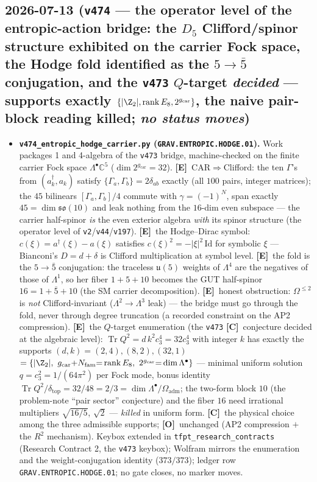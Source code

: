 \documentclass[11pt]{article}
\providecommand{\mE}{\textbf{[E]}}\providecommand{\mC}{\textbf{[C]}}
\providecommand{\mO}{\textbf{[O]}}\providecommand{\mX}{\textbf{[X]}}
\providecommand{\cthree}{c_3}\providecommand{\phiz}{\varphi_0^{\mathrm{ret}}}
\providecommand{\gcar}{g_{\mathrm{car}}}\providecommand{\Nfam}{N_{\mathrm{fam}}}
\providecommand{\Oadm}{\Omega_{\mathrm{adm}}}\providecommand{\ainv}{\alpha^{-1}}
\begin{document}
\subsection*{2026-07-13 (\texttt{v474} --- the operator level of the entropic-action bridge: the $D_5$ Clifford/spinor structure exhibited on the carrier Fock space, the Hodge fold identified as the $5{\to}\bar5$ conjugation, and the \texttt{v473} $Q$-target \emph{decided} --- supports exactly $\{|\Z_2|,\operatorname{rank}E_8,2^{\gcar}\}$, the naive pair-block reading killed; \emph{no status moves})}
\begin{itemize}[leftmargin=1.5em]
\item \textbf{\texttt{v474\_entropic\_hodge\_carrier.py} (\texttt{GRAV.ENTROPIC.HODGE.01}).} Work packages
1 and 4-algebra of the \texttt{v473} bridge, machine-checked on the finite carrier Fock space
$\Lambda^\bullet\mathbb C^5$ ($\dim 2^{\gcar}{=}32$). \mE\ CAR${\Rightarrow}$Clifford: the ten
$\Gamma$'s from $(a_k^\dagger,a_k)$ satisfy $\{\Gamma_a,\Gamma_b\}{=}2\delta_{ab}$ exactly (all $100$
pairs, integer matrices); the $45$ bilinears $[\Gamma_a,\Gamma_b]/4$ commute with $\gamma{=}(-1)^N$,
span exactly $45{=}\dim\mathfrak{so}(10)$ and leak nothing from the $16$-dim even subspace --- the
carrier half-spinor \emph{is} the even exterior algebra \emph{with} its spinor structure (the operator
level of \texttt{v2}/\texttt{v44}/\texttt{v197}). \mE\ the Hodge--Dirac symbol: $c(\xi){=}a^\dagger(\xi)
{-}a(\xi)$ satisfies $c(\xi)^2{=}-|\xi|^2\,\mathrm{Id}$ for symbolic $\xi$ --- Bianconi's $D{=}d{+}
\delta$ is Clifford multiplication at symbol level. \mE\ the fold is the $5{\to}\bar5$ conjugation:
the traceless $\mathfrak u(5)$ weights of $\Lambda^4$ are the negatives of those of $\Lambda^1$, so her
fiber $1{+}5{+}10$ becomes the GUT half-spinor $16{=}1{+}\bar5{+}10$ (the SM carrier decomposition).
\mE\ honest obstruction: $\Omega^{\le2}$ is \emph{not} Clifford-invariant ($\Lambda^2{\to}\Lambda^3$
leak) --- the bridge must go through the fold, never through degree truncation (a recorded constraint
on the AP2 compression). \mE\ the $Q$-target enumeration (the \texttt{v473} \mC\ conjecture decided at
the algebraic level): $\operatorname{Tr}Q^2{=}d\,k^2\cthree^4{=}32\cthree^4$ with integer $k$ has
exactly the supports $(d,k){=}(2,4),(8,2),(32,1)$ $=\{|\Z_2|,\ \gcar{+}\Nfam{=}\operatorname{rank}E_8,\
2^{\gcar}{=}\dim\Lambda^\bullet\}$ --- minimal uniform solution $q{=}\cthree^2{=}1/(64\pi^2)$ per Fock
mode, bonus identity $\operatorname{Tr}Q^2/\delta_{\mathrm{top}}{=}32/48{=}2/3{=}\dim\Lambda^\bullet/
\Oadm$; the two-form block $10$ (the problem-note ``pair sector'' conjecture) and the fiber $16$ need
irrational multipliers $\sqrt{16/5}$, $\sqrt2$ --- \emph{killed} in uniform form. \mC\ the physical
choice among the three admissible supports; \mO\ unchanged (AP2 compression $+$ the $R^2$ mechanism).
Keybox extended in \texttt{tfpt\_research\_contracts} (Research Contract 2, the \texttt{v473} keybox);
Wolfram mirrors the enumeration and the weight-conjugation identity ($373/373$); ledger row
\texttt{GRAV.ENTROPIC.HODGE.01}; no gate closes, no marker moves.
\end{itemize}
\end{document}
